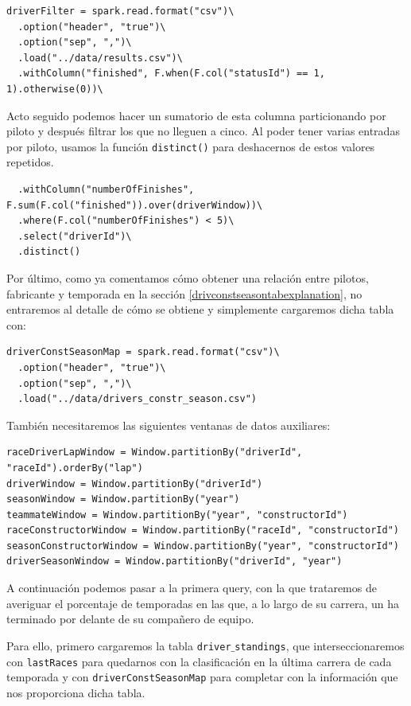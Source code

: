 \documentclass[12pt,twoside,titlepage]{report}
\begin{document}
\begin{lstlisting}
driverFilter = spark.read.format("csv")\
  .option("header", "true")\
  .option("sep", ",")\
  .load("../data/results.csv")\
  .withColumn("finished", F.when(F.col("statusId") == 1, 1).otherwise(0))\
\end{lstlisting}

Acto seguido podemos hacer un sumatorio de esta columna particionando por piloto y después filtrar los que no lleguen a cinco. Al poder tener varias entradas por piloto, usamos la función \texttt{distinct()} para deshacernos de estos valores repetidos.

\begin{lstlisting}
  .withColumn("numberOfFinishes", F.sum(F.col("finished")).over(driverWindow))\
  .where(F.col("numberOfFinishes") < 5)\
  .select("driverId")\
  .distinct()
\end{lstlisting}

Por último, como ya comentamos cómo obtener una relación entre pilotos, fabricante y temporada en la sección  \ref{drivconstseasontabexplanation}, no entraremos al detalle de cómo se obtiene y simplemente cargaremos dicha tabla con:

\begin{lstlisting}
driverConstSeasonMap = spark.read.format("csv")\
  .option("header", "true")\
  .option("sep", ",")\
  .load("../data/drivers_constr_season.csv")
\end{lstlisting}

También necesitaremos las siguientes ventanas de datos auxiliares:

\begin{lstlisting}
raceDriverLapWindow = Window.partitionBy("driverId", "raceId").orderBy("lap")
driverWindow = Window.partitionBy("driverId")
seasonWindow = Window.partitionBy("year")
teammateWindow = Window.partitionBy("year", "constructorId")
raceConstructorWindow = Window.partitionBy("raceId", "constructorId")
seasonConstructorWindow = Window.partitionBy("year", "constructorId")
driverSeasonWindow = Window.partitionBy("driverId", "year")
\end{lstlisting}


A continuación podemos pasar a la primera query, con la que trataremos de averiguar el porcentaje de temporadas en las que, a lo largo de su carrera, un ha terminado por delante de su compañero de equipo.


Para ello, primero cargaremos la tabla \texttt{driver$\_$standings}, que interseccionaremos con \texttt{lastRaces} para quedarnos con la clasificación en la última carrera de cada temporada y con \texttt{driverConstSeasonMap} para completar con la información que nos proporciona dicha tabla.
\end{document}
